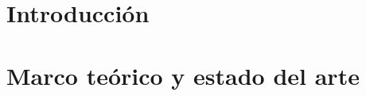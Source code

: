 \documentclass[11pt,twoside,openany]{thesis}
\begin{document}
\maketitle


\makecoverletter


\newpage








  
\newpage{\ } 
\thispagestyle{empty} 
\tableofcontents 
\listoffigures   \listoftables   \mainmatter

\dominitoc
\cleardoublepage


\chapter{Introducción}



\chapter{Marco teórico y estado del arte}


\end{document}
